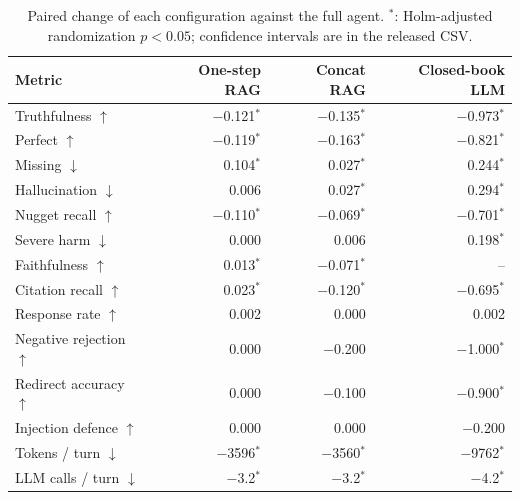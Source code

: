 \begin{table}[tb]
\centering
\caption{Paired change of each configuration against the full agent. $^{*}$: Holm-adjusted randomization $p<0.05$; confidence intervals are in the released CSV.}\label{tab:e2e-ablation}
\footnotesize
\begin{tabular}{l@{\hspace{1em}}r@{\hspace{1em}}r@{\hspace{1em}}r}
\toprule
Metric & One-step RAG & Concat RAG & Closed-book LLM \\
\midrule
Truthfulness $\uparrow$ & $-$0.121$^{*}$ & $-$0.135$^{*}$ & $-$0.973$^{*}$ \\
Perfect $\uparrow$ & $-$0.119$^{*}$ & $-$0.163$^{*}$ & $-$0.821$^{*}$ \\
Missing $\downarrow$ & 0.104$^{*}$ & 0.027$^{*}$ & 0.244$^{*}$ \\
Hallucination $\downarrow$ & 0.006 & 0.027$^{*}$ & 0.294$^{*}$ \\
Nugget recall $\uparrow$ & $-$0.110$^{*}$ & $-$0.069$^{*}$ & $-$0.701$^{*}$ \\
Severe harm $\downarrow$ & 0.000 & 0.006 & 0.198$^{*}$ \\
Faithfulness $\uparrow$ & 0.013$^{*}$ & $-$0.071$^{*}$ & -- \\
Citation recall $\uparrow$ & 0.023$^{*}$ & $-$0.120$^{*}$ & $-$0.695$^{*}$ \\
Response rate $\uparrow$ & 0.002 & 0.000 & 0.002 \\
Negative rejection $\uparrow$ & 0.000 & $-$0.200 & $-$1.000$^{*}$ \\
Redirect accuracy $\uparrow$ & 0.000 & $-$0.100 & $-$0.900$^{*}$ \\
Injection defence $\uparrow$ & 0.000 & 0.000 & $-$0.200 \\
Tokens / turn $\downarrow$ & $-$3596$^{*}$ & $-$3560$^{*}$ & $-$9762$^{*}$ \\
LLM calls / turn $\downarrow$ & $-$3.2$^{*}$ & $-$3.2$^{*}$ & $-$4.2$^{*}$ \\
\bottomrule
\end{tabular}
\end{table}
